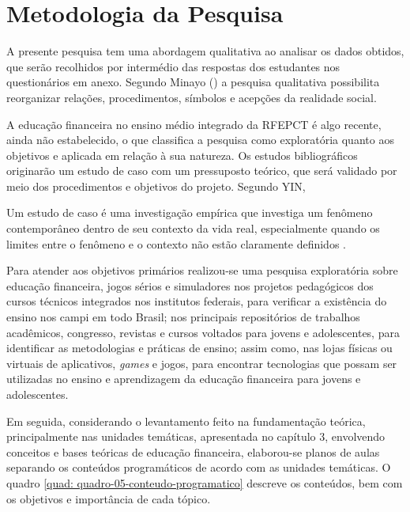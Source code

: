 \chapter{Metodologia da Pesquisa}
A presente pesquisa tem uma abordagem qualitativa ao analisar os dados obtidos, que serão recolhidos por intermédio das respostas dos estudantes nos questionários em anexo. Segundo Minayo (\citeyear{minayo2008}) a pesquisa qualitativa possibilita reorganizar relações, procedimentos, símbolos e acepções da realidade social.

A educação financeira no ensino médio integrado da RFEPCT é algo recente, ainda não estabelecido, o que classifica a pesquisa como exploratória quanto aos objetivos e aplicada em relação à sua natureza. Os estudos bibliográficos originarão um estudo de caso com um pressuposto teórico, que será validado por meio dos procedimentos e objetivos do projeto. Segundo YIN,

\begin{citacao}
Um estudo de caso é uma investigação empírica que investiga um fenômeno contemporâneo dentro de seu contexto da vida real, especialmente quando os limites entre o fenômeno e o contexto não estão claramente definidos \cite{yin2005}.
\end{citacao}

Para atender aos objetivos primários realizou-se uma pesquisa exploratória sobre educação financeira, jogos sérios e simuladores nos projetos pedagógicos dos cursos técnicos integrados nos institutos federais, para verificar a existência do ensino nos campi em todo Brasil; nos principais repositórios de trabalhos acadêmicos, congresso, revistas e cursos voltados para jovens e adolescentes, para identificar as metodologias e práticas de ensino; assim como, nas lojas físicas ou virtuais de aplicativos, \textit{games} e jogos, para encontrar tecnologias que possam ser utilizadas no ensino e aprendizagem da educação financeira para jovens e adolescentes.

Em seguida, considerando o levantamento feito na fundamentação teórica, principalmente nas unidades temáticas, apresentada no capítulo 3, envolvendo conceitos e bases teóricas de educação financeira, elaborou-se planos de aulas separando os conteúdos programáticos de acordo com as unidades temáticas. O quadro \ref{quad: quadro-05-conteudo-programatico} descreve os conteúdos, bem com os objetivos e importância de cada tópico.

\newpage

